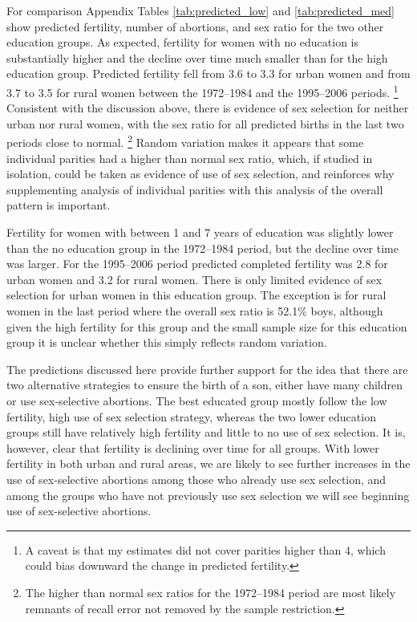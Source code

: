 \documentclass[12pt,letterpaper]{article}
\begin{document}
For comparison Appendix Tables \ref{tab:predicted_low} and \ref{tab:predicted_med}
show predicted fertility, number of abortions, and sex ratio for the two other
education groups.
As expected, fertility for women with no education is substantially higher
and the decline over time much smaller than for the high education group.
Predicted fertility fell from 3.6 to 3.3 for urban women and from 3.7 to 3.5 for rural 
women between the 1972--1984 and the 1995--2006 periods.%
\footnote{
A caveat is that my estimates did not cover parities higher than 4, which could
bias downward the change in predicted fertility.
}
Consistent with the discussion above, there is evidence of sex selection for neither
urban nor rural women, with the sex ratio for all predicted births in the last two periods 
close to normal.%
\footnote{
The higher than normal sex ratios for the 1972--1984 period are most likely
remnants of recall error not removed by the sample restriction. 
}
Random variation makes it appears that some individual parities had a higher
than normal sex ratio, which, if studied in isolation, could be taken as evidence
of use of sex selection, and reinforces why supplementing analysis of individual 
parities with this analysis of the overall pattern is important.

Fertility for women with between 1 and 7 years of education was slightly lower than the 
no education group in the 1972--1984 period, but the decline over time was larger.
For the 1995--2006 period predicted completed fertility was 2.8 for urban women and
3.2 for rural women.
There is only limited evidence of sex selection for urban women in this education group.
The exception is for rural women in the last period where the overall sex ratio is
52.1\% boys, although given the high fertility for this group and the small sample
size for this education group it is unclear whether this simply reflects random variation.


The predictions discussed here provide further support for the idea that there are 
two alternative strategies to ensure the birth of a son, either have many children 
or use sex-selective abortions.
The best educated group mostly follow the low fertility, high use of sex selection
strategy, whereas the two lower education groups still have relatively high fertility
and little to no use of sex selection.
It is, however, clear that fertility is declining over time for all groups.
With lower fertility in both urban and rural areas, we are likely to see 
further increases in the use of sex-selective abortions among those who already
use sex selection, and among the groups who have not previously use sex selection
we will see beginning use of sex-selective abortions.
\end{document}
